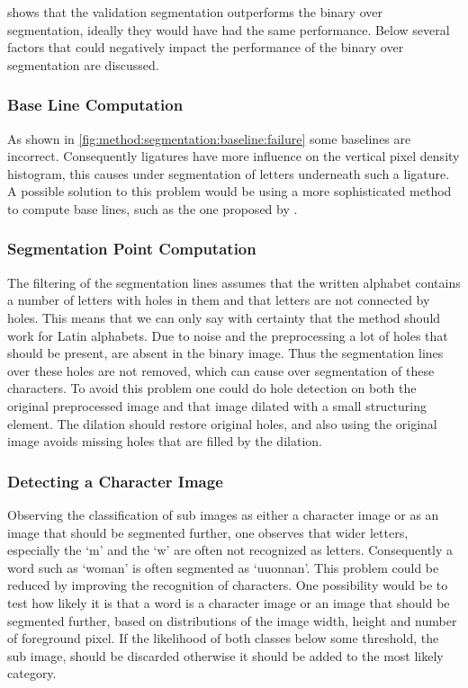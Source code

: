  shows that the validation segmentation outperforms the binary over segmentation, ideally they would have had the same performance. Below several factors that could negatively impact the performance of the binary over segmentation are discussed.


\subsubsection{Base Line Computation}
	As shown in \cref{fig:method:segmentation:baseline:failure} some baselines are incorrect. Consequently ligatures have more influence on the vertical pixel density histogram, this causes under segmentation of letters underneath such a ligature. A possible solution to this problem would be using a more sophisticated method to compute base lines, such as the one proposed by \citet{lee2012binary}.

\subsubsection{Segmentation Point Computation}
	The filtering of the segmentation lines assumes that the written alphabet contains a number of letters with holes in them and that letters are not connected by holes. This means that we can only say with certainty that the method should work for Latin alphabets. Due to noise and the preprocessing a lot of holes that should be present, are absent in the binary image. Thus the segmentation lines over these holes are not removed, which can cause over segmentation of these characters. To avoid this problem one could do hole detection on both the original preprocessed image and that image dilated with a small structuring element. The dilation should restore original holes, and also using the original image avoids missing holes that are filled by the dilation.

\subsubsection{Detecting a Character Image}
	Observing the classification of sub images as either a character image or  as an image that should be segmented further, one observes that wider letters, especially the `m' and the `w' are often not recognized as letters. Consequently a word such as `woman' is often segmented as `uuonnan'. This problem could be reduced by improving the recognition of characters. One possibility would be to test how likely it is that a word is a character image or an image that should be segmented further, based on distributions of the image width, height and number of foreground pixel. If the likelihood of both classes below some threshold, the sub image, should be discarded otherwise it should be added to the most likely category. 